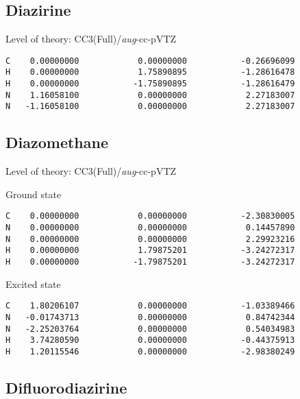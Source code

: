 \documentclass[journal=jctcce,manuscript=article,layout=traditional]{achemso}
\newcommand{\AVTZ}{\emph{aug}-cc-pVTZ}
\begin{document}
\subsection*{Diazirine}

\begin{singlespace}
Level of theory: CC3(Full)/{\AVTZ}
\begin{verbatim}
C    0.00000000            0.00000000           -0.26696099
H    0.00000000            1.75890895           -1.28616478
H    0.00000000           -1.75890895           -1.28616479
N    1.16058100            0.00000000            2.27183007
N   -1.16058100            0.00000000            2.27183007
\end{verbatim}
\end{singlespace}

\subsection*{Diazomethane}

\begin{singlespace}
Level of theory: CC3(Full)/{\AVTZ}
\end{singlespace}

\begin{singlespace}
Ground state
\begin{verbatim}
C    0.00000000            0.00000000           -2.30830005
N    0.00000000            0.00000000            0.14457890
N    0.00000000            0.00000000            2.29923216
H    0.00000000            1.79875201           -3.24272317
H    0.00000000           -1.79875201           -3.24272317
\end{verbatim}
\end{singlespace}

\begin{singlespace}
\noindent Excited state
\begin{verbatim}
C    1.80206107            0.00000000           -1.03389466
N   -0.01743713            0.00000000            0.84742344
N   -2.25203764            0.00000000            0.54034983  
H    3.74280590            0.00000000           -0.44375913
H    1.20115546            0.00000000           -2.98380249
\end{verbatim}
\end{singlespace}

\subsection*{Difluorodiazirine}
\end{document}
